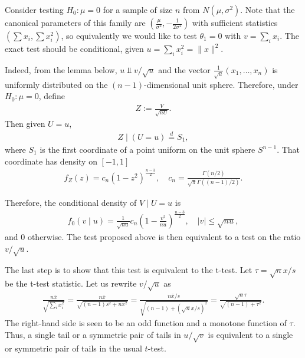 \begin{eg} 
Consider testing $H_0: \mu=0$ for a sample of size $n$ from $N\left(\mu, \sigma^2\right)$. Note that the canonical parameters of this family are $\left(\frac{\mu}{\sigma^2},-\frac{1}{2 \sigma^2}\right)$ with sufficient statistics $(\sum x_i,\sum x_i^2)$, so equivalently we would like to test $\theta_1=0$ with $v=\sum_i x_i$. The exact test should be conditional, given $u=\sum_i x_i^2=\|x\|^2$. 

Indeed, from the lemma below, $u \Perp v / \sqrt{u}$ and the vector $\frac{1}{\sqrt{u}}\left(x_1, \ldots, x_n\right)$ is uniformly distributed on the $(n-1)$-dimensional unit sphere. Therefore, under $H_0: \mu=0$, define
\begin{align*}
Z:=\frac{V}{\sqrt{n U}} .
\end{align*}
Then given $U=u$,
\begin{align*}
Z \mid(U=u) \stackrel{d}{=} S_1,
\end{align*}
where $S_1$ is the first coordinate of a point uniform on the unit sphere $S^{n-1}$. That coordinate has density on $[-1,1]$
\begin{align*}
f_Z(z)=c_n\left(1-z^2\right)^{\frac{n-3}{2}}, \quad c_n=\frac{\Gamma(n / 2)}{\sqrt{\pi} \Gamma((n-1) / 2)} .
\end{align*}

Therefore, the conditional density of $V \mid U=u$ is
\begin{align*}
f_0(v \mid u)=\frac{1}{\sqrt{n u}} c_n\left(1-\frac{v^2}{n u}\right)^{\frac{n-3}{2}}, \quad|v| \leq \sqrt{n u},
\end{align*}
and $0$ otherwise. The test proposed above is then equivalent to a test on the ratio $v/\sqrt{u}$.

The last step is to show that this test is equivalent to the t-test. Let $\tau= \sqrt{n} x / s$ be the t-test statistic. Let us rewrite $v / \sqrt{u}$ as
\begin{align*}
\frac{n \bar{x}}{\sqrt{\sum_i x_i^2}}=\frac{n \bar{x}}{\sqrt{(n-1) s^2+n x^2}}=\frac{n \bar{x} / s}{\sqrt{(n-1)+(\sqrt{n} x / s)^2}}=\frac{\sqrt{n} \tau}{\sqrt{(n-1)+\tau^2}} .
\end{align*}
The right-hand side is seen to be an odd function and a monotone function of $\tau$. Thus, a single tail or a symmetric pair of tails in $u / \sqrt{v}$ is equivalent to a single or symmetric pair of tails in the usual $t$-test.
\end{eg}

